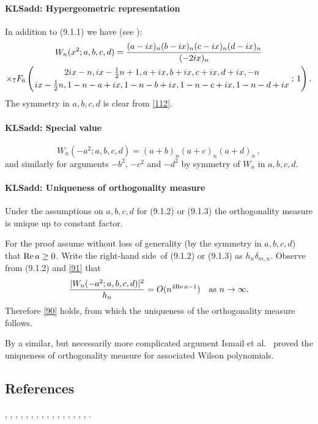 \documentclass[envcountchap,graybox]{svmono}
\newcounter{rom}
\newcommand{\hyp}[5]{\mbox{}_{#1}{F}_{#2}
\left(\genfrac{}{}{0pt}{}{#3}{#4}\,;\,#5\right)}
\newcommand\de\delta
\newcommand\thalf{\tfrac12}
\newcommand\iy\infty
\newcommand{\hyp}[5]{\,\mbox{}_{#1}F_{#2}\!\left(
  \genfrac{}{}{0pt}{}{#3}{#4};#5\right)}
\newcommand\RHS{right-hand side}
\renewcommand\Re{{\rm Re}\,}
\begin{document}
\paragraph{\large\bf KLSadd: Hypergeometric representation}In addition to (9.1.1) we have (see ):
\begin{multline}
W_n(x^2;a,b,c,d)
=\frac{(a-ix)_n (b-ix)_n (c-ix)_n (d-ix)_n}{(-2ix)_n}\\
\times\hyp76{2ix-n,ix-\thalf n+1,a+ix,b+ix,c+ix,d+ix,-n}
{ix-\thalf n,1-n-a+ix,1-n-b+ix,1-n-c+ix,1-n-d+ix}1.
\label{112}
\end{multline}
The symmetry in $a,b,c,d$ is clear from \eqref{112}.
%
\paragraph{\large\bf KLSadd: Special value}\begin{equation}
W_n(-a^2;a,b,c,d)=(a+b)_n(a+c)_n(a+d)_n\,,
\label{91}
\end{equation}
and similarly for arguments $-b^2$, $-c^2$ and
$-d^2$ by symmetry of $W_n$ in $a,b,c,d$.
%
\paragraph{\large\bf KLSadd: Uniqueness of orthogonality measure}Under the assumptions on $a,b,c,d$ for (9.1.2) or (9.1.3) the orthogonality
measure is unique up to constant factor.

For the proof assume without
loss of generality (by the symmetry in $a,b,c,d$) that $\Re a\ge0$.
Write the \RHS\ of (9.1.2) or (9.1.3) as $h_n\de_{m,n}$.
Observe from (9.1.2) and \eqref{91} that
\[
\frac{|W_n(-a^2;a,b,c,d)|^2}{h_n} = O(n^{4\Re a-1})\quad\hbox{as $n\to\iy$.}
\]
Therefore \eqref{90} holds, from which the uniqueness of the orthogonality
measure follows.

By a similar, but necessarily more complicated argument Ismail et al.\
 proved the uniqueness of orthogonality measure for
associated Wilson polynomials.
%
\subsection*{References}
\cite{Askey89I}, \cite{AskeyWilson82}, \cite{AskeyWilson85}, \cite{AtakRahmanSuslov},
\cite{Ismail2005II}, \cite{IsmailLetMasVal}, \cite{IsmailLetValWimp90},
\cite{IsmailLetValWimp91}, \cite{Koorn85}, \cite{Koorn88}, \cite{LeskyWaibel},
\cite{Masson91}, \cite{Miller87}, \cite{MimachiII}, \cite{ValentAssche}, \cite{Wilson80}, 
\cite{Wilson91}.
\end{document}

